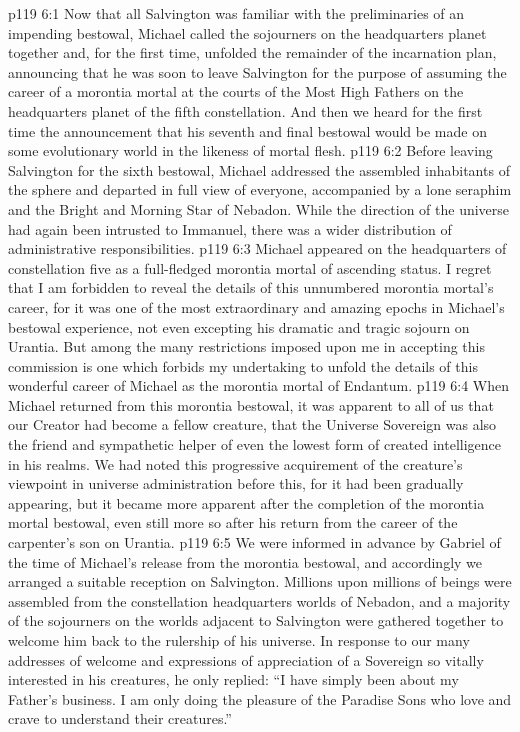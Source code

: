 \vs p119 6:1 Now that all Salvington was familiar with the preliminaries of an impending bestowal, Michael called the sojourners on the headquarters planet together and, for the first time, unfolded the remainder of the incarnation plan, announcing that he was soon to leave Salvington for the purpose of assuming the career of a morontia mortal at the courts of the Most High Fathers on the headquarters planet of the fifth constellation. And then we heard for the first time the announcement that his seventh and final bestowal would be made on some evolutionary world in the likeness of mortal flesh.
\vs p119 6:2 Before leaving Salvington for the sixth bestowal, Michael addressed the assembled inhabitants of the sphere and departed in full view of everyone, accompanied by a lone seraphim and the Bright and Morning Star of Nebadon. While the direction of the universe had again been intrusted to Immanuel, there was a wider distribution of administrative responsibilities.
\vs p119 6:3 Michael appeared on the headquarters of constellation five as a full\hyp{}fledged morontia mortal of ascending status. I regret that I am forbidden to reveal the details of this unnumbered morontia mortal’s career, for it was one of the most extraordinary and amazing epochs in Michael’s bestowal experience, not even excepting his dramatic and tragic sojourn on Urantia. But among the many restrictions imposed upon me in accepting this commission is one which forbids my undertaking to unfold the details of this wonderful career of Michael as the morontia mortal of Endantum.
\vs p119 6:4 When Michael returned from this morontia bestowal, it was apparent to all of us that our Creator had become a fellow creature, that the Universe Sovereign was also the friend and sympathetic helper of even the lowest form of created intelligence in his realms. We had noted this progressive acquirement of the creature’s viewpoint in universe administration before this, for it had been gradually appearing, but it became more apparent after the completion of the morontia mortal bestowal, even still more so after his return from the career of the carpenter’s son on Urantia.
\vs p119 6:5 We were informed in advance by Gabriel of the time of Michael’s release from the morontia bestowal, and accordingly we arranged a suitable reception on Salvington. Millions upon millions of beings were assembled from the constellation headquarters worlds of Nebadon, and a majority of the sojourners on the worlds adjacent to Salvington were gathered together to welcome him back to the rulership of his universe. In response to our many addresses of welcome and expressions of appreciation of a Sovereign so vitally interested in his creatures, he only replied: “I have simply been about my Father’s business. I am only doing the pleasure of the Paradise Sons who love and crave to understand their creatures.”
